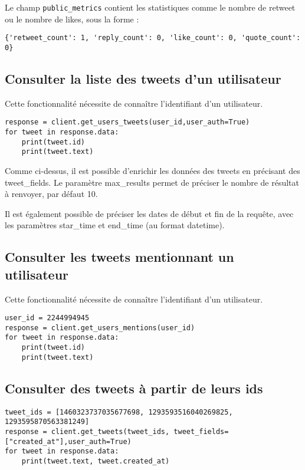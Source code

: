 \documentclass[11pt,a4paper]{article}
\begin{document}
Le champ \verb+public_metrics+ contient les statistiques comme le nombre de retweet ou le nombre de likes, sous la forme : 
\begin{verbatim}
{'retweet_count': 1, 'reply_count': 0, 'like_count': 0, 'quote_count': 0}
\end{verbatim}

\subsection{Consulter la liste des tweets d'un utilisateur}
Cette fonctionnalité nécessite de connaître l'identifiant d'un utilisateur.

\begin{lstlisting}
response = client.get_users_tweets(user_id,user_auth=True)
for tweet in response.data:
    print(tweet.id)
    print(tweet.text)
\end{lstlisting}  
Comme ci-dessus, il est possible d'enrichir les données des tweets en précisant des tweet\_fields.
Le paramètre max\_results permet de préciser le nombre de résultat à renvoyer, par défaut 10.

Il est également possible de préciser les dates de début et fin de la requête, avec les paramètres star\_time et end\_time (au format datetime). 

\subsection{Consulter les tweets mentionnant un utilisateur}
Cette fonctionnalité nécessite de connaître l'identifiant d'un utilisateur. 

\begin{lstlisting}
user_id = 2244994945
response = client.get_users_mentions(user_id)
for tweet in response.data:
    print(tweet.id)
    print(tweet.text)
\end{lstlisting} 

\subsection{Consulter des tweets à partir de leurs ids}

\begin{lstlisting}
tweet_ids = [1460323737035677698, 1293593516040269825, 1293595870563381249]
response = client.get_tweets(tweet_ids, tweet_fields=["created_at"],user_auth=True)
for tweet in response.data:
    print(tweet.text, tweet.created_at)
\end{lstlisting}  
\end{document}
